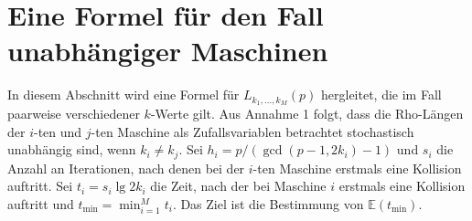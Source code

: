 \documentclass[a4paper, 10pt, ngerman]{article}
\newcommand{\E}{\mathbb{E}}
\begin{document}
\section{Eine Formel für den Fall unabhängiger Maschinen}

In diesem Abschnitt wird eine Formel für $L_{k_1, \dots, k_M}(p)$ hergleitet, die im Fall paarweise verschiedener $k$-Werte gilt. Aus Annahme 1 folgt, dass die Rho-Längen der $i$-ten und $j$-ten Maschine als Zufallsvariablen betrachtet stochastisch unabhängig sind, wenn $k_i \ne k_j$. Sei $h_i = p/(\gcd(p - 1, 2k_i) - 1)$ und $s_i$ die Anzahl an Iterationen, nach denen bei der $i$-ten Maschine erstmals eine Kollision auftritt. Sei $t_i = s_i \lg 2k_i$ die Zeit, nach der bei Maschine $i$ erstmals eine Kollision auftritt und $t_{\min} = \min_{i = 1}^M t_i$. Das Ziel ist die Bestimmung von $\E(t_{\min})$.
\end{document}
